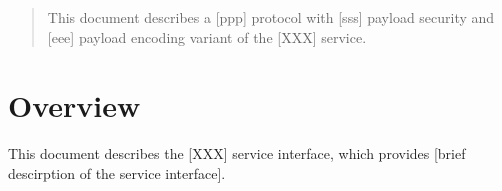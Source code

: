 \documentclass[a4paper]{arrowhead}
\begin{document}
\ArrowheadDate{\today}
\ArrowheadSetup

\begin{center}
  \vspace*{1cm}
  \huge{\arrowtitle}

  \vspace*{0.2cm}
  \LARGE{\arrowtype}
  \vspace*{1cm}
\end{center}

  \vspace*{\fill}


  \vspace*{1cm}
  \vspace*{\fill}

  \begin{abstract}
    This document describes a [ppp] protocol with [sss] payload
    security and [eee] payload encoding variant of the [XXX] service.
  \end{abstract}
  \vspace*{1cm}

\newpage

\tableofcontents
\newpage

\section{Overview}
\label{sec:overview}

This document describes the [XXX] service interface,
which provides [brief descirption of the service interface].
\end{document}
